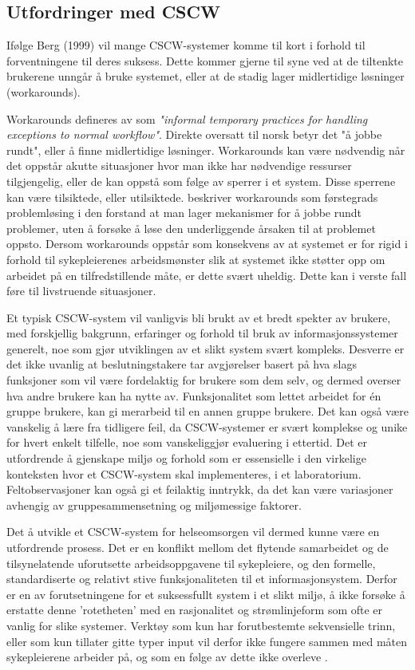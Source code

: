\subsection{Utfordringer med CSCW}
\label{chp:utfordringerMedCSCW}

\noindent
Ifølge Berg (1999) vil mange CSCW-systemer komme til kort i forhold til forventningene til deres suksess. Dette kommer gjerne til syne ved at de tiltenkte brukerene unngår å bruke systemet, eller at de stadig lager midlertidige løsninger (workarounds).

\noindent
Workarounds defineres av \citet{Kobayashi05} som \emph{"informal temporary practices for handling exceptions to normal workflow"}. Direkte oversatt til norsk betyr det "å jobbe rundt", eller å finne midlertidige løsninger.
Workarounds kan være nødvendig når det oppstår akutte situasjoner hvor man ikke har nødvendige ressurser tilgjengelig, eller de kan oppstå som følge av sperrer i et system. Disse sperrene kan være tilsiktede, eller utilsiktede. \citet{Vogelsmeier08} beskriver workarounds som førstegrads problemløsing i den forstand at man lager mekanismer for å jobbe rundt problemer, uten å forsøke å løse den underliggende årsaken til at problemet oppsto. Dersom workarounds oppstår som konsekvens av at systemet er for rigid i forhold til sykepleierenes arbeidsmønster slik at systemet ikke støtter opp om arbeidet på en tilfredstillende måte, er dette svært uheldig. Dette kan i verste fall føre til livstruende situasjoner.


\noindent
Et typisk CSCW-system vil vanligvis bli brukt av et bredt spekter av brukere, med forskjellig bakgrunn, erfaringer og forhold til bruk av informasjonssystemer generelt, noe som gjør utviklingen av et slikt system svært kompleks. Desverre er det ikke uvanlig at beslutningstakere tar avgjørelser basert på hva slags funksjoner som vil være fordelaktig for brukere som dem selv, og dermed overser hva andre brukere kan ha nytte av. Funksjonalitet som lettet arbeidet for én gruppe brukere, kan gi merarbeid til en annen gruppe brukere. Det kan også være vanskelig å lære fra tidligere feil, da CSCW-systemer er svært komplekse og unike for hvert enkelt tilfelle, noe som vanskeliggjør evaluering i ettertid. Det er utfordrende å gjenskape miljø og forhold som er essensielle i den virkelige konteksten hvor et CSCW-system skal implementeres, i et laboratorium. Feltobservasjoner kan også gi et feilaktig inntrykk, da det kan være variasjoner avhengig av gruppesammensetning og miljømessige faktorer.

\noindent
Det å utvikle et CSCW-system for helseomsorgen vil dermed kunne være en utfordrende prosess. Det er en konflikt mellom det flytende samarbeidet og de tilsynelatende uforutsette arbeidsoppgavene til sykepleiere, og den formelle, standardiserte og relativt stive funksjonaliteten til et informasjonsystem. Derfor er en av forutsetningene for et suksessfullt system i et slikt miljø, å ikke forsøke å erstatte denne 'rotetheten' med en rasjonalitet og strømlinjeform som ofte er vanlig for slike systemer. Verktøy som kun har forutbestemte sekvensielle trinn, eller som kun tillater gitte typer input vil derfor ikke fungere sammen med måten sykepleierene arbeider på, og som en følge av dette ikke overleve \cite{Berg99}.